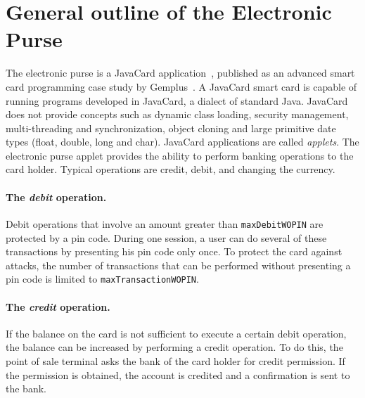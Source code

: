 \documentclass[a4paper]{llncs}
\begin{document}
\section{General outline of the Electronic Purse}
\label{SectGenPurse}

The electronic purse is a JavaCard application~\cite{JavaCardURL}, published
as an advanced smart card programming case study by
Gemplus~\cite{PurseUrl}. A JavaCard smart card is capable of running
programs developed in {JavaCard}, a dialect of
standard Java. {JavaCard} does not provide concepts such as dynamic
class loading, security management, multi-threading and
synchronization, object cloning and large primitive date types (float,
double, long and char).  JavaCard applications are called
\emph{applets}.  The electronic purse applet provides  the ability to 
perform banking operations to the card holder. Typical operations are
credit, debit, and changing the currency.

\paragraph{\bf The \textit{debit} operation.} 
Debit operations that involve an amount greater than
\texttt{maxDebitWOPIN} are protected by a pin code. During one session, 
a user can do several of these transactions by presenting his pin code
only once. To protect the card against attacks, the number of
transactions that can be performed without presenting a pin code is
limited to \texttt{maxTransactionWOPIN}.




\paragraph{\bf The \textit{credit} operation.} 
If the balance on the card is not sufficient to execute a certain
debit operation, the balance can be increased by performing a credit
operation. To do this, the point of sale terminal asks the bank of the
card holder for credit permission. If the permission is obtained, the
account is credited and a confirmation is sent to the bank.
\end{document}
